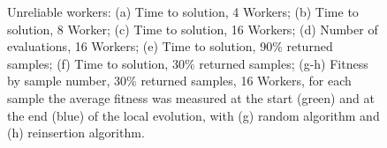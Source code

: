 \begin{figure}[htp]
{        \label{fig:plot_percent_90}
    }
    \caption{Unreliable workers: (a) Time to solution, 4 Workers; (b) Time to solution, 8 Worker;
    (c) Time to solution, 16 Workers; (d) Number of evaluations, 16 Workers; (e) Time to solution, 90\% returned samples;
    (f) Time to solution, 30\% returned samples; (g-h) Fitness by sample number, 30\% returned samples, 16 Workers,
    for each sample the average fitness was measured at the start (green) and at the end (blue) of the local evolution, with (g) random algorithm and
    (h) reinsertion algorithm.  }
    \label{fig:effort_unreliable}
\end{figure}


